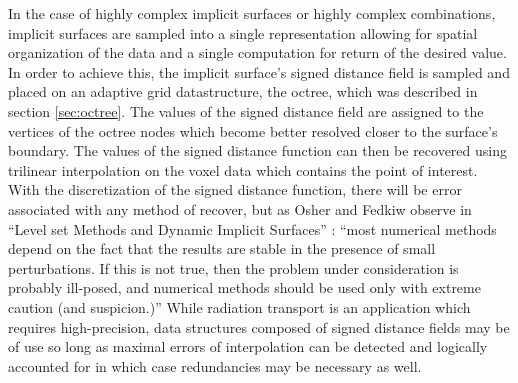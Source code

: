 \documentclass[12pt, a4paper]{article}
\begin{document}
In the case of highly complex implicit surfaces or highly complex combinations, implicit surfaces are sampled into a single representation allowing for spatial organization of the data and a single computation for return of the desired value. In order to achieve this, the implicit surface's signed distance field is sampled and placed on an adaptive grid datastructure, the octree, which was described in section \ref{sec:octree}. The values of the signed distance field are assigned to the vertices of the octree nodes which become better resolved closer to the surface's boundary. The values of the signed distance function can then be recovered using trilinear interpolation on the voxel data which contains the point of interest. With the discretization of the signed distance function, there will be error associated with any method of recover, but as Osher and Fedkiw observe in ``Level set Methods and Dynamic Implicit Surfaces'' \cite{level_set_methods_and_dynamic_implicit_surfaces}: ``most numerical methods depend on the fact that the results are stable in the presence of small perturbations. If this is not true, then the problem under consideration is probably ill-posed, and numerical methods should be used only with extreme caution (and suspicion.)'' While radiation transport is an application which requires high-precision, data structures composed of signed distance fields may be of use so long as maximal errors of interpolation can be detected and logically accounted for in which case redundancies may be necessary as well.








\end{document}
